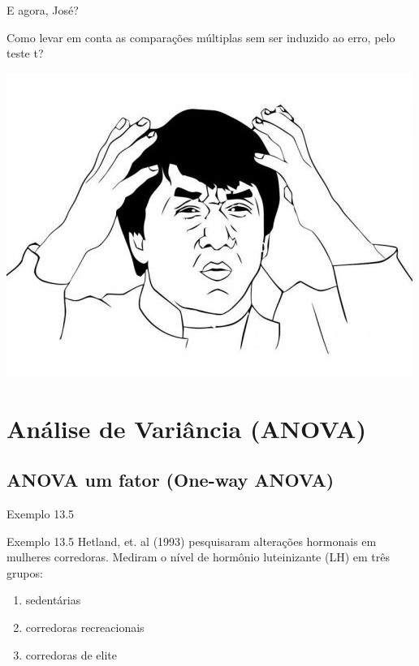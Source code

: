\documentclass{beamer}
\begin{document}
\begin{frame}{E agora, José?}
  \begin{block}{}
    Como levar em conta as comparações múltiplas sem ser induzido ao erro, pelo teste t?
  \end{block}
  \bigskip
  \begin{center}
    \includegraphics[width=.4\textwidth]{Cap10-11/Jackie-Chan-WTF}
  \end{center}
\end{frame}


\section[ANOVA]{Análise de Variância (ANOVA)}

\subsection{ANOVA um fator (One-way ANOVA)}

\begin{frame}[label=exemplo13.5-enunciado]{\small Exemplo 13.5}
  \begin{exampleblock}{Exemplo 13.5}
    \small
    Hetland, et. al (1993) pesquisaram alterações hormonais em mulheres corredoras.
    Mediram o nível de hormônio luteinizante (LH) em três grupos:
    \bigskip
    \begin{enumerate}
      \small
    \item sedentárias
    \item corredoras recreacionais
    \item corredoras de elite
    \end{enumerate}
  \end{exampleblock}
\end{frame}
\end{document}
